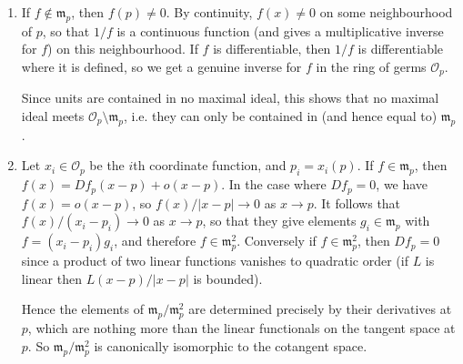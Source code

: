 \documentclass{report}
\newcommand{\m}{\mathfrak{m}}
\renewcommand{\O}{\mathscr{O}} %
\begin{document}
\begin{enumerate}[label=\textbf{2.1.\Alph*.}]
	\item If $f\notin\m_p$, then $f(p)\ne0$. By continuity, $f(x)\ne0$ on some
	      neighbourhood of $p$, so that $1/f$ is a continuous function
	      (and gives a multiplicative inverse for $f$) on this neighbourhood. If
	      $f$ is differentiable, then $1/f$ is differentiable where it is defined,
	      so we get a genuine inverse for $f$ in the ring of germs $\O_p$.

	      Since units are contained in no maximal ideal, this shows that no
	      maximal ideal meets $\O_p\setminus\m_p$, i.e. they can only be contained
	      in (and hence equal to) $\m_p$.
	\item Let $x_i\in\O_p$ be the $i$th coordinate function, and $p_i=x_i(p)$.
	      If $f\in\m_p$, then $f(x)=Df_p(x-p) + o(x-p)$. In the case where
	      $Df_p=0$, we have $f(x)=o(x-p)$, so $f(x)/|x-p|\to0$ as $x\to p$. It
	      follows that $f(x)/(x_i-p_i)\to0$ as $x\to p$, so that they give
	      elements $g_i\in\m_p$ with $f=(x_i-p_i)g_i$, and therefore
	      $f\in\m_p^2$. Conversely if $f\in\m_p^2$, then $Df_p=0$ since a
	      product of two linear functions vanishes to quadratic order (if $L$ is
	      linear then $L(x-p)/|x-p|$ is bounded).

	      Hence the elements of $\m_p/\m_p^2$ are determined precisely by their
	      derivatives at $p$, which are nothing more than the linear
	      functionals on the tangent space at $p$. So $\m_p/\m_p^2$ is
	      canonically isomorphic to the cotangent space.
\end{enumerate}
\end{document}
